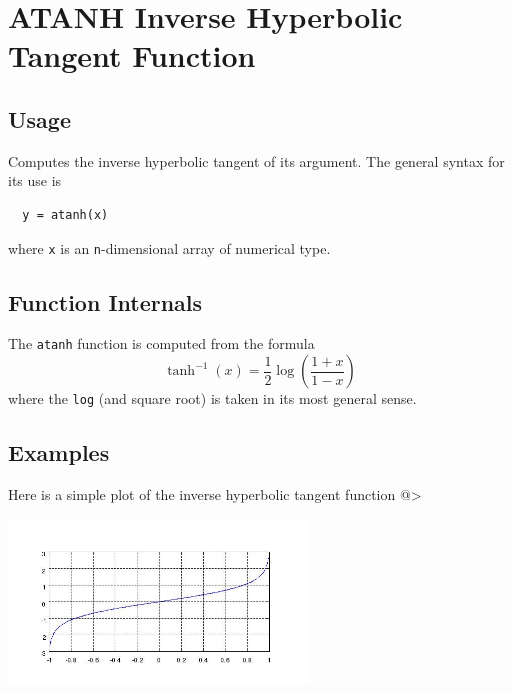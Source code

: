 \section{ATANH Inverse Hyperbolic Tangent Function}

\subsection{Usage}

Computes the inverse hyperbolic tangent of its argument.  The general
syntax for its use is
\begin{verbatim}
  y = atanh(x)
\end{verbatim}
where \verb|x| is an \verb|n|-dimensional array of numerical type.
\subsection{Function Internals}

The \verb|atanh| function is computed from the formula
\[
   \tanh^{-1}(x) = \frac{1}{2}\log\left(\frac{1+x}{1-x}\right)
\]
where the \verb|log| (and square root) is taken in its most general sense.
\subsection{Examples}

Here is a simple plot of the inverse hyperbolic tangent function
@>


\centerline{\includegraphics[width=8cm]{atanhplot}}


